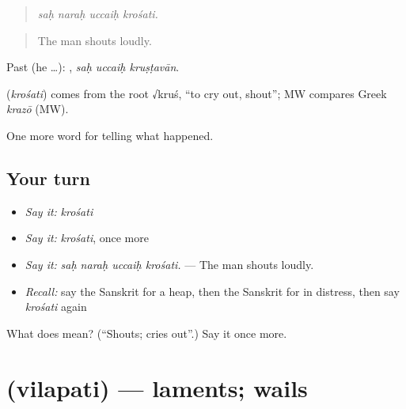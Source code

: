 \begin{quote}
   
\end{quote}

\begin{quote}
\emph{saḥ naraḥ uccaiḥ krośati.}
\end{quote}

\begin{quote}
The man shouts loudly.
\end{quote}

Past (he …):   , \emph{saḥ uccaiḥ kruṣṭavān}.

\begin{cousinweb}
\textbf{} (\emph{krośati}) comes from the root √kruś, \textquotedblleft{}to cry out, shout\textquotedblright{}; MW compares Greek \emph{krazō} (MW).
\end{cousinweb}

\begin{grammarlens}[title={What you've built}]
One more word for telling what happened.
\end{grammarlens}

\subsection*{Your turn}
\begin{itemize}
\raggedright
  \item \emph{Say it:} \emph{krośati}
  \item \emph{Say it:} \emph{krośati}, once more
  \item \emph{Say it:} \emph{saḥ naraḥ uccaiḥ krośati.} — The man shouts loudly.
  \item \emph{Recall:} say the Sanskrit for a heap, then the Sanskrit for in distress, then say \emph{krośati} again
\end{itemize}

\begin{tcolorbox}[breakable,colback=teal!4,colframe=teal!35!black,title={Before you move on}]
What does  mean? (\textquotedblleft{}Shouts; cries out\textquotedblright{}.) Say it once more.
\end{tcolorbox}
\section[\texorpdfstring{\sk{विलपति} (vilapati)}{विलपति (vilapati)}]{ (vilapati) — laments; wails}

